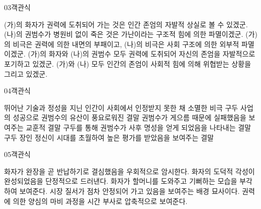 \documentclass[fs85,seriesWit]{korfarm-base}
\begin{document}
\begin{kfQBlock}{03}{객관식}
\begin{kfChoices}
\kfChoice (가)의 화자가 권력에 도취되어 가는 것은 인간 존엄의 자발적 상실로 볼 수 있겠군.
\kfChoice (나)의 권범수가 병원비 없이 죽은 것은 가난이라는 구조적 힘에 의한 파멸이겠군.
\kfChoice (가)의 비극은 권력에 의한 내면의 부패이고, (나)의 비극은 사회 구조에 의한 외부적 파멸이겠군.
\kfChoice (가)의 화자와 (나)의 권범수 모두 권력에 도취되어 자신의 존엄을 자발적으로 포기하고 있겠군.
\kfChoice (가)와 (나) 모두 인간의 존엄이 사회적 힘에 의해 위협받는 상황을 그리고 있겠군.
\end{kfChoices}
\end{kfQBlock}

\begin{kfQBlock}{04}{객관식}
\begin{kfChoices}
\kfChoice 뛰어난 기술과 정성을 지닌 인간이 사회에서 인정받지 못한 채 소멸한 비극
\kfChoice 구두 사업의 성공으로 권범수의 유산이 풍요로워진 결말
\kfChoice 권범수가 게으름 때문에 실패했음을 보여주는 교훈적 결말
\kfChoice 구두를 통해 권범수가 사후 명성을 얻게 되었음을 나타내는 결말
\kfChoice 구두 장인 정신이 시대를 초월하여 높은 평가를 받았음을 보여주는 결말
\end{kfChoices}
\end{kfQBlock}

\begin{kfQBlock}{05}{객관식}
\begin{kfChoices}
\kfChoice 화자가 완장을 곧 반납하기로 결심했음을 우회적으로 암시한다.
\kfChoice 화자의 도덕적 각성이 완성되었음을 단정적으로 드러낸다.
\kfChoice 화자가 할머니를 도와주고 기뻐하는 모습을 부각하여 보여준다.
\kfChoice 시장 질서가 점차 안정되어 가고 있음을 보여주는 배경 묘사이다.
\kfChoice 권력에 의한 양심의 마비 과정을 시간 부사로 압축적으로 보여준다.
\end{kfChoices}
\end{kfQBlock}

\kfEndMC
\end{document}
